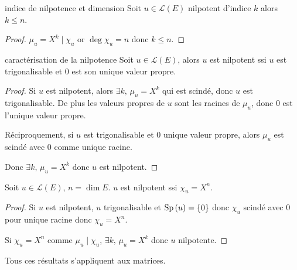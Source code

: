 \begin{corollaire}{indice de nilpotence et dimension}{}
    Soit $u \in \mathscr L(E)$ nilpotent d'indice $k$ alors $k \leqslant n$.
\end{corollaire}

\begin{proof}
    $\mu_u = X^k \mid \chi_u$ or $\deg \chi_u = n$ donc $k \leqslant n$. 
\end{proof}

\begin{corollaire}{caractérisation de la nilpotence}{}
    Soit $u \in \mathscr L(E)$, alors $u$ est nilpotent ssi $u$ est trigonalisable et $0$ est son unique valeur
    propre. 
\end{corollaire}

\begin{proof}
    Si $u$ est nilpotent, alors $\exists k, \, \mu_u = X^k$ qui est scindé, donc $u$ est trigonalisable.
    De plus les valeurs propres de $u$ sont les racines de $\mu_u$, donc $0$ est l'unique valeur propre.

    Réciproquement, si $u$ est trigonalisable et $0$ unique valeur propre, alors $\mu_u$ est scindé avec 
    $0$ comme unique racine. 

    Donc $\exists k, \, \mu_u = X^k$ donc $u$ est nilpotent.
\end{proof}

\begin{corollaire}{}{}
    Soit $u \in \mathscr L(E)$, $n = \dim E$. $u$ est nilpotent ssi $\chi_u = X^n$.
\end{corollaire}

\begin{proof}
    Si $u$ est nilpotent, $u$ trigonalisable et $\operatorname{Sp} \,(u) = \{0\}$ donc $\chi_u$ scindé avec $0$ pour unique 
    racine donc $\chi_u = X^n$.

    Si $\chi_u = X^n$ comme $\mu_u \mid \chi_u$, $\exists k, \, \mu_u = X^k$ donc $u$ nilpotente. 
\end{proof}

\begin{remarque}
    Tous ces résultats s'appliquent aux matrices. 
\end{remarque}

